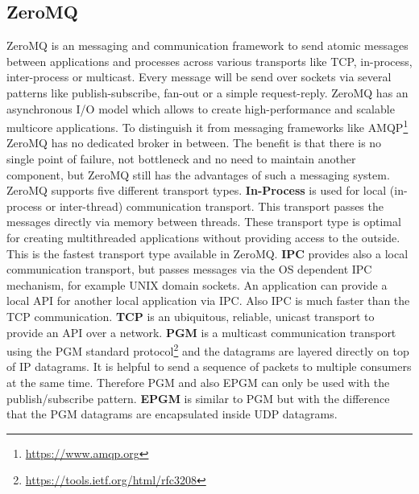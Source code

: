 \subsection{ZeroMQ}
\label{section:ZeroMQ}
ZeroMQ is an messaging and communication framework to send atomic messages between applications and processes across various transports like \ac{TCP}, in-process, inter-process or multicast.\autocite[cf.]{ZeroMQ:Guide}
Every message will be send over sockets via several patterns like publish-subscribe, fan-out or a simple request-reply.\autocite[cf.]{ZeroMQ:Guide}
ZeroMQ has an asynchronous I/O model which allows to create high-performance and scalable multicore applications.\autocite[cf.]{ZeroMQ:Guide}
To distinguish it from messaging frameworks like \ac{AMQP}\footnote{\url{https://www.amqp.org}} ZeroMQ has no dedicated broker in between.
The benefit is that there is no single point of failure, not bottleneck and no need to maintain another component, but ZeroMQ still has the advantages of such a messaging system.
ZeroMQ supports five different transport types.\newline\newline
\textbf{In-Process} is used for local (in-process or inter-thread) communication transport.
This transport passes the messages directly via memory between threads.\autocite[cf.]{ZeroMQ:inproc}
These transport type is optimal for creating multithreaded applications without providing access to the outside.
This is the fastest transport type available in ZeroMQ.\newline\newline
\textbf{\ac{IPC}} provides also a local communication transport, but passes messages via the \ac{OS} dependent \ac{IPC} mechanism, for example UNIX domain sockets.
An application can provide a local \ac{API} for another local application via \ac{IPC}.
Also \ac{IPC} is much faster than the \ac{TCP} communication.\newline\newline
\textbf{\ac{TCP}} is an ubiquitous, reliable, unicast transport to provide an \ac{API} over a network.\autocite[cf.]{ZeroMQ:tcp}\newline\newline
\textbf{\ac{PGM}} is a multicast communication transport using the \ac{PGM} standard protocol\footnote{\url{https://tools.ietf.org/html/rfc3208}} and the datagrams are layered directly on top of IP datagrams.\autocite[cf.]{ZeroMQ:pgm}
It is helpful to send a sequence of packets to multiple consumers at the same time.
Therefore \ac{PGM} and also \acs{EPGM} can only be used with the publish/subscribe pattern.\newline
\textbf{\ac{EPGM}} is similar to \ac{PGM} but with the difference that the PGM datagrams are encapsulated inside UDP datagrams.\autocite[cf.]{ZeroMQ:pgm}

